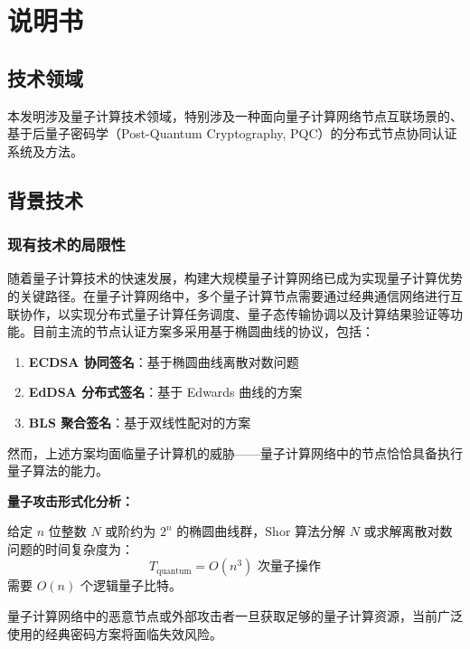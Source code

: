 \newpage
\section{说明书}

\subsection{技术领域}

本发明涉及量子计算技术领域，特别涉及一种面向量子计算网络节点互联场景的、基于后量子密码学（Post-Quantum Cryptography, PQC）的分布式节点协同认证系统及方法。

\subsection{背景技术}

\subsubsection{现有技术的局限性}

随着量子计算技术的快速发展，构建大规模量子计算网络已成为实现量子计算优势的关键路径。在量子计算网络中，多个量子计算节点需要通过经典通信网络进行互联协作，以实现分布式量子计算任务调度、量子态传输协调以及计算结果验证等功能。目前主流的节点认证方案多采用基于椭圆曲线的协议，包括：

\begin{enumerate}
    \item \textbf{ECDSA 协同签名}：基于椭圆曲线离散对数问题
    \item \textbf{EdDSA 分布式签名}：基于 Edwards 曲线的方案
    \item \textbf{BLS 聚合签名}：基于双线性配对的方案
\end{enumerate}

然而，上述方案均面临量子计算机的威胁——量子计算网络中的节点恰恰具备执行量子算法的能力。

\textbf{量子攻击形式化分析：}

\begin{theorem}
给定 $n$ 位整数 $N$ 或阶约为 $2^n$ 的椭圆曲线群，Shor 算法分解 $N$ 或求解离散对数问题的时间复杂度为：
$$T_{\text{quantum}} = O(n^3) \text{ 次量子操作}$$
需要 $O(n)$ 个逻辑量子比特。
\end{theorem}

\begin{corollary}[传统密码脆弱性]
量子计算网络中的恶意节点或外部攻击者一旦获取足够的量子计算资源，当前广泛使用的经典密码方案将面临失效风险。
\end{corollary}

